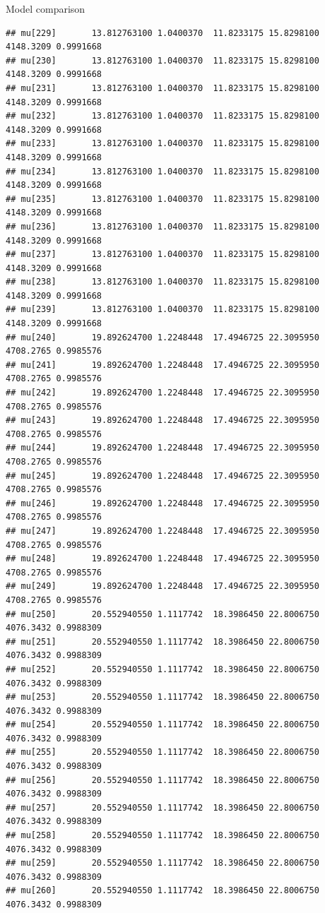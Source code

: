 \documentclass[
  ignorenonframetext,
]{beamer}
\begin{document}
\begin{frame}[fragile]{Model comparison}
\begin{verbatim}
## mu[229]       13.812763100 1.0400370  11.8233175 15.8298100 4148.3209 0.9991668
## mu[230]       13.812763100 1.0400370  11.8233175 15.8298100 4148.3209 0.9991668
## mu[231]       13.812763100 1.0400370  11.8233175 15.8298100 4148.3209 0.9991668
## mu[232]       13.812763100 1.0400370  11.8233175 15.8298100 4148.3209 0.9991668
## mu[233]       13.812763100 1.0400370  11.8233175 15.8298100 4148.3209 0.9991668
## mu[234]       13.812763100 1.0400370  11.8233175 15.8298100 4148.3209 0.9991668
## mu[235]       13.812763100 1.0400370  11.8233175 15.8298100 4148.3209 0.9991668
## mu[236]       13.812763100 1.0400370  11.8233175 15.8298100 4148.3209 0.9991668
## mu[237]       13.812763100 1.0400370  11.8233175 15.8298100 4148.3209 0.9991668
## mu[238]       13.812763100 1.0400370  11.8233175 15.8298100 4148.3209 0.9991668
## mu[239]       13.812763100 1.0400370  11.8233175 15.8298100 4148.3209 0.9991668
## mu[240]       19.892624700 1.2248448  17.4946725 22.3095950 4708.2765 0.9985576
## mu[241]       19.892624700 1.2248448  17.4946725 22.3095950 4708.2765 0.9985576
## mu[242]       19.892624700 1.2248448  17.4946725 22.3095950 4708.2765 0.9985576
## mu[243]       19.892624700 1.2248448  17.4946725 22.3095950 4708.2765 0.9985576
## mu[244]       19.892624700 1.2248448  17.4946725 22.3095950 4708.2765 0.9985576
## mu[245]       19.892624700 1.2248448  17.4946725 22.3095950 4708.2765 0.9985576
## mu[246]       19.892624700 1.2248448  17.4946725 22.3095950 4708.2765 0.9985576
## mu[247]       19.892624700 1.2248448  17.4946725 22.3095950 4708.2765 0.9985576
## mu[248]       19.892624700 1.2248448  17.4946725 22.3095950 4708.2765 0.9985576
## mu[249]       19.892624700 1.2248448  17.4946725 22.3095950 4708.2765 0.9985576
## mu[250]       20.552940550 1.1117742  18.3986450 22.8006750 4076.3432 0.9988309
## mu[251]       20.552940550 1.1117742  18.3986450 22.8006750 4076.3432 0.9988309
## mu[252]       20.552940550 1.1117742  18.3986450 22.8006750 4076.3432 0.9988309
## mu[253]       20.552940550 1.1117742  18.3986450 22.8006750 4076.3432 0.9988309
## mu[254]       20.552940550 1.1117742  18.3986450 22.8006750 4076.3432 0.9988309
## mu[255]       20.552940550 1.1117742  18.3986450 22.8006750 4076.3432 0.9988309
## mu[256]       20.552940550 1.1117742  18.3986450 22.8006750 4076.3432 0.9988309
## mu[257]       20.552940550 1.1117742  18.3986450 22.8006750 4076.3432 0.9988309
## mu[258]       20.552940550 1.1117742  18.3986450 22.8006750 4076.3432 0.9988309
## mu[259]       20.552940550 1.1117742  18.3986450 22.8006750 4076.3432 0.9988309
## mu[260]       20.552940550 1.1117742  18.3986450 22.8006750 4076.3432 0.9988309

\end{verbatim}
\end{frame}
\end{document}
